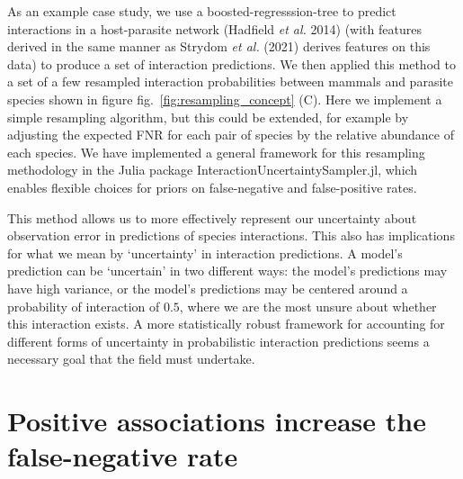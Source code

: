 \documentclass[10pt,oneside]{article}
\begin{document}
As an example case study, we use a boosted-regresssion-tree to predict
interactions in a host-parasite network (Hadfield \emph{et al.} 2014)
(with features derived in the same manner as Strydom \emph{et al.}
(2021) derives features on this data) to produce a set of interaction
predictions. We then applied this method to a set of a few resampled
interaction probabilities between mammals and parasite species shown in
figure fig.~\ref{fig:resampling_concept} (C). Here we implement a simple
resampling algorithm, but this could be extended, for example by
adjusting the expected FNR for each pair of species by the relative
abundance of each species. We have implemented a general framework for
this resampling methodology in the Julia package
InteractionUncertaintySampler.jl, which enables flexible choices for
priors on false-negative and false-positive rates.

This method allows us to more effectively represent our uncertainty
about observation error in predictions of species interactions. This
also has implications for what we mean by `uncertainty' in interaction
predictions. A model's prediction can be `uncertain' in two different
ways: the model's predictions may have high variance, or the model's
predictions may be centered around a probability of interaction of
\(0.5\), where we are the most unsure about whether this interaction
exists. A more statistically robust framework for accounting for
different forms of uncertainty in probabilistic interaction predictions
seems a necessary goal that the field must undertake.

\hypertarget{positive-associations-increase-the-false-negative-rate}{%
\section{Positive associations increase the false-negative
rate}\label{positive-associations-increase-the-false-negative-rate}}
\end{document}
